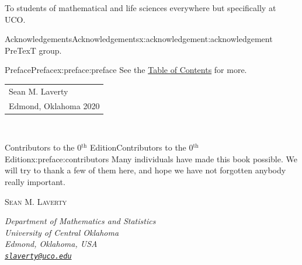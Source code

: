 \documentclass[oneside,10pt,]{book}
\newcommand{\mono}[1]{\texttt{#1}}
\newcommand{\contributor}[1]{\parbox{\linewidth}{#1}\par\bigskip}
\newcommand{\contributorname}[1]{\textsc{#1}\\[0.25\baselineskip]}
\newcommand{\contributorinfo}[1]{\hspace*{0.05\linewidth}\parbox{0.95\linewidth}{\textsl{#1}}}
\begin{document}
\null\clearpage
\cleardoublepage
\thispagestyle{empty}
\begin{center}\Large%
To students of mathematical and life sciences everywhere but specifically at UCO.%
\end{center}
\clearpage
\thispagestyle{empty}
\null%
\clearpage
%
%
\typeout{************************************************}
\typeout{************************************************}
%
\begin{acknowledgement}{Acknowledgements}{}{Acknowledgements}{}{}{x:acknowledgement:acknowledgement}
PreTexT group.%
\end{acknowledgement}
%
%
\typeout{************************************************}
\typeout{************************************************}
%
\begin{preface}{Preface}{}{Preface}{}{}{x:preface:preface}
See the \hyperlink{x:book:mathstat}{Table of Contents} for more.%
\nopagebreak\par%
\hfill\begin{tabular}[t]{l@{}}
Sean M. Laverty\\
Edmond, Oklahoma 2020
\end{tabular}\\\par
\end{preface}
%
%
\typeout{************************************************}
\typeout{************************************************}
%
\begin{preface}{Contributors to the 0\(^\mathrm{th}\) Edition}{}{Contributors to the 0\(^\mathrm{th}\) Edition}{}{}{x:preface:contributors}
Many individuals have made this book possible.  We will try to thank a few of them here, and hope we have not forgotten anybody really important.%
\begin{multicols}{2}
\hypertarget{x:contributor:slaverty}{}%
\contributor{%
\contributorname{Sean M. Laverty}%
\contributorinfo{Department of Mathematics and Statistics\\
University of Central Oklahoma\\
Edmond, Oklahoma, USA\\
\mono{\href{mailto:slaverty@uco.edu}{\nolinkurl{slaverty@uco.edu}}}}%
}%
\end{multicols}
\end{preface}
\end{document}
